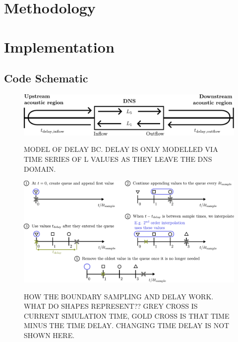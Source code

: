\section{Methodology}

\section{Implementation}


\subsection{Code Schematic}

\begin{figure}[t]
\centering
\includegraphics[scale=0.6]{assets/imgs/delay_bc_model.pdf}
\label{fig:delay-model}
\caption{MODEL OF DELAY BC. DELAY IS ONLY MODELLED VIA TIME SERIES OF L VALUES AS THEY LEAVE THE DNS DOMAIN.}
\end{figure}

\begin{figure}[t]
\centering
\includegraphics[scale=0.6]{assets/imgs/delay_bc_queue.pdf}
\label{fig:delay-queue}
\caption{HOW THE BOUNDARY SAMPLING AND DELAY WORK. WHAT DO SHAPES REPRESENT?? GREY CROSS IS CURRENT SIMULATION TIME, GOLD CROSS IS THAT TIME MINUS THE TIME DELAY. CHANGING TIME DELAY IS NOT SHOWN HERE.}
\end{figure}

